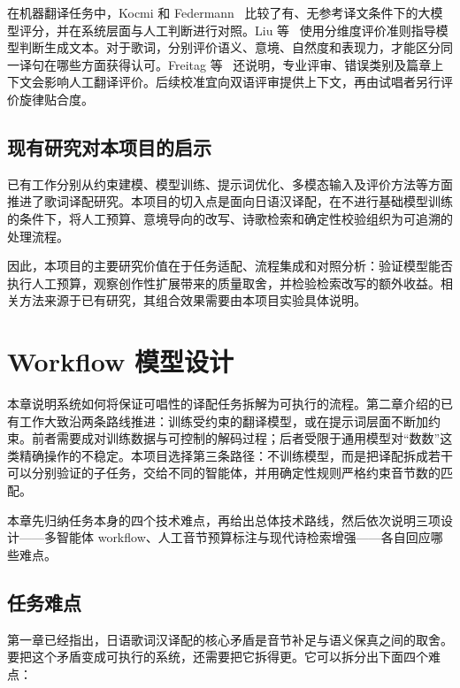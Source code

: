 \documentclass[12pt, a4paper]{ctexart}
\numberwithin{table}{section}
\numberwithin{figure}{section}
\begin{document}
在机器翻译任务中，Kocmi 和 Federmann~\cite{kocmi-federmann-2023-large} 比较了有、无参考译文条件下的大模型评分，并在系统层面与人工判断进行对照。Liu 等~\cite{kocmi-federmann-2023-gemba} 使用分维度评价准则指导模型判断生成文本。对于歌词，分别评价语义、意境、自然度和表现力，才能区分同一译句在哪些方面获得认可。Freitag 等~\cite{freitag-etal-2021-experts} 还说明，专业评审、错误类别及篇章上下文会影响人工翻译评价。后续校准宜向双语评审提供上下文，再由试唱者另行评价旋律贴合度。

\subsection{现有研究对本项目的启示}
已有工作分别从约束建模、模型训练、提示词优化、多模态输入及评价方法等方面推进了歌词译配研究。本项目的切入点是面向日语汉译配，在不进行基础模型训练的条件下，将人工预算、意境导向的改写、诗歌检索和确定性校验组织为可追溯的处理流程。

因此，本项目的主要研究价值在于任务适配、流程集成和对照分析：验证模型能否执行人工预算，观察创作性扩展带来的质量取舍，并检验检索改写的额外收益。相关方法来源于已有研究，其组合效果需要由本项目实验具体说明。

\section{Workflow 模型设计}

本章说明系统如何将保证可唱性的译配任务拆解为可执行的流程。第二章介绍的已有工作大致沿两条路线推进：训练受约束的翻译模型，或在提示词层面不断加约束。前者需要成对训练数据与可控制的解码过程；后者受限于通用模型对“数数”这类精确操作的不稳定。本项目选择第三条路径：不训练模型，而是把译配拆成若干可以分别验证的子任务，交给不同的智能体，并用确定性规则严格约束音节数的匹配。

本章先归纳任务本身的四个技术难点，再给出总体技术路线，然后依次说明三项设计——多智能体 workflow、人工音节预算标注与现代诗检索增强——各自回应哪些难点。

\subsection{任务难点}

第一章已经指出，日语歌词汉译配的核心矛盾是音节补足与语义保真之间的取舍。要把这个矛盾变成可执行的系统，还需要把它拆得更。它可以拆分出下面四个难点：

\newcommand{\subsub}[1]{\phantomsection\subsubsection*{#1}\addcontentsline{toc}{subsubsection}{#1}}
\end{document}
